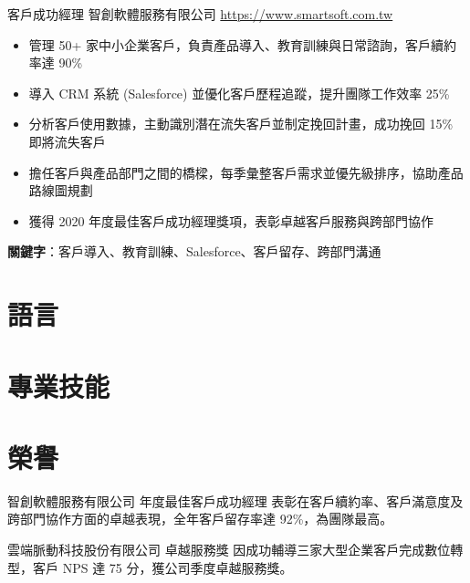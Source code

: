\documentclass[a4paper, serif, 10pt]{moderncv}
\begin{document}
        {客戶成功經理}
        {智創軟體服務有限公司}
        {\url{https://www.smartsoft.com.tw}}
        {}
        {\begin{itemize}
\item 管理 50+ 家中小企業客戶，負責產品導入、教育訓練與日常諮詢，客戶續約率達 90\%
\item 導入 CRM 系統 (Salesforce) 並優化客戶歷程追蹤，提升團隊工作效率 25\%
\item 分析客戶使用數據，主動識別潛在流失客戶並制定挽回計畫，成功挽回 15\% 即將流失客戶
\item 擔任客戶與產品部門之間的橋樑，每季彙整客戶需求並優先級排序，協助產品路線圖規劃
\item 獲得 2020 年度最佳客戶成功經理獎項，表彰卓越客戶服務與跨部門協作
\end{itemize}
\textbf{關鍵字}：客戶導入、教育訓練、Salesforce、客戶留存、跨部門溝通}
\section{語言}

\section{專業技能}

\section{榮譽}

        {智創軟體服務有限公司}
        {年度最佳客戶成功經理}
        {}
        {}
        {表彰在客戶續約率、客戶滿意度及跨部門協作方面的卓越表現，全年客戶留存率達 92\%，為團隊最高。}

        {雲端脈動科技股份有限公司}
        {卓越服務獎}
        {}
        {}
        {因成功輔導三家大型企業客戶完成數位轉型，客戶 NPS 達 75 分，獲公司季度卓越服務獎。}
\end{document}
